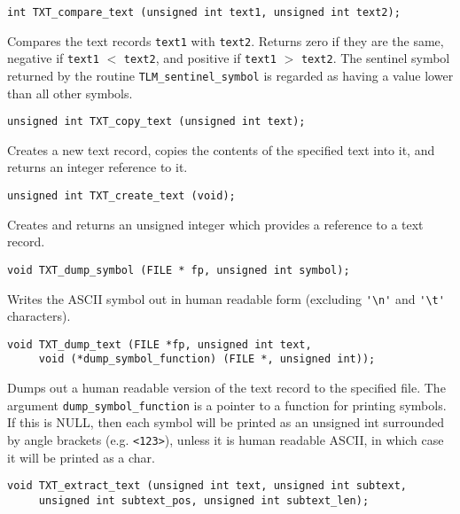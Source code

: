 \documentclass[11pt]{article}
\begin{document}
{\begin{verbatim}
int TXT_compare_text (unsigned int text1, unsigned int text2);
\end{verbatim}

\vspace{-0.2cm}
Compares the text records \verb|text1| with \verb|text2|. Returns zero if they are the same,
negative if \verb|text1| $<$ \verb|text2|, and positive if \verb|text1| $>$ \verb|text2|.
The sentinel symbol returned by the routine \verb|TLM_sentinel_symbol| is regarded as
having a value lower than all other symbols.

\begin{verbatim}
unsigned int TXT_copy_text (unsigned int text);
\end{verbatim}

\vspace{-0.2cm}
Creates a new text record, copies the contents of the specified text
into it, and returns an integer reference to it.

\begin{verbatim}
unsigned int TXT_create_text (void);
\end{verbatim}

\vspace{-0.2cm}
Creates and returns an unsigned integer which provides a reference to a text
record.

\begin{verbatim}
void TXT_dump_symbol (FILE * fp, unsigned int symbol);
\end{verbatim}

\vspace{-0.2cm}
Writes the ASCII symbol out in human readable form (excluding \verb|'\n'| and \verb|'\t'| characters).

\begin{verbatim}
void TXT_dump_text (FILE *fp, unsigned int text,
     void (*dump_symbol_function) (FILE *, unsigned int));
\end{verbatim}

\vspace{-0.2cm}
Dumps out a human readable version of the text record to the specified file. The argument
\verb|dump_symbol_function| is a pointer to a function for printing symbols. If this is NULL,
then each symbol will be printed as an unsigned int surrounded by angle brackets
(e.g. \verb|<123>|), unless it is human readable ASCII, in which case it will be printed as a char.

\begin{verbatim}
void TXT_extract_text (unsigned int text, unsigned int subtext,
     unsigned int subtext_pos, unsigned int subtext_len);
\end{verbatim}

}
\end{document}
